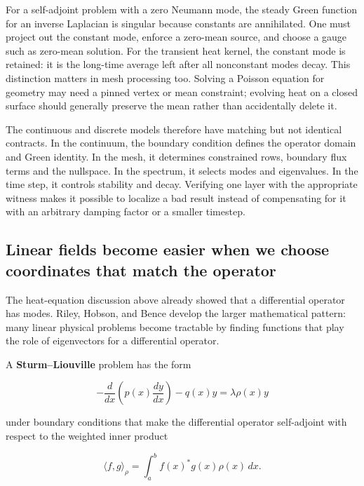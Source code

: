 For a self-adjoint problem with a zero Neumann mode, the steady Green function for an inverse Laplacian is singular because constants are annihilated. One must project out the constant mode, enforce a zero-mean source, and choose a gauge such as zero-mean solution. For the transient heat kernel, the constant mode is retained: it is the long-time average left after all nonconstant modes decay. This distinction matters in mesh processing too. Solving a Poisson equation for geometry may need a pinned vertex or mean constraint; evolving heat on a closed surface should generally preserve the mean rather than accidentally delete it.

The continuous and discrete models therefore have matching but not identical contracts. In the continuum, the boundary condition defines the operator domain and Green identity. In the mesh, it determines constrained rows, boundary flux terms and the nullspace. In the spectrum, it selects modes and eigenvalues. In the time step, it controls stability and decay. Verifying one layer with the appropriate witness makes it possible to localize a bad result instead of compensating for it with an arbitrary damping factor or a smaller timestep.

\subsection{Linear fields become easier when we choose coordinates that match the operator}\label{02-foundations-ii-ch025-linear-fields-become-easier-when-we-choose-coordinates-that-match-the-operator}

\hypertarget{02-foundations-ii-ch025-linear-fields-become-easier-when-we-choose-coordinates-that-match-the-operator}{}

The heat-equation discussion above already showed that a differential operator has modes. Riley, Hobson, and Bence develop the larger mathematical pattern: many linear physical problems become tractable by finding functions that play the role of eigenvectors for a differential operator.

A \textbf{Sturm--Liouville} problem has the form

\[
-\frac{d}{dx}
\left(
p(x)\frac{dy}{dx}
\right)
-q(x)y
=
\lambda \rho(x)y
\]

under boundary conditions that make the differential operator self-adjoint with respect to the weighted inner product

\[
\langle f,g\rangle_\rho
=
\int_a^b
f(x)^*g(x)\rho(x)\,dx.
\]

